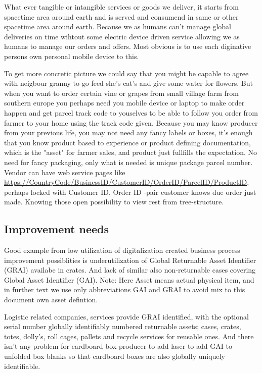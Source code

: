 What ever tangible or intangible services or goods we deliver, it starts from
spacetime area around earth and is served and consumend in same or other
spacetime area around earth. Because we as humans can't manage global deliveries
on time wihtout some electric device driven service allowing we as humans to
manage our orders and offers. Most obvious is to use each diginative persons
own personal mobile device to this.

To get more concretic picture we could say that you might be capable to agree
with neigbour granny to go feed she's cat's and give some water for flowers.
But when you want to order certain vine or grapes from small village farm from
southern europe you perhaps need you mobile device or laptop to make order
happen and get parcel track code to youselves to be able to follow you order
from farmer to your home using the track code given. Because you may know
producer from your previous life, you may not need any fancy labels or boxes,
it's enough that you know product based to experience or product defining
documentation, which is the "asset" for farmer sales, and product just
fullfills the expectation. No need for fancy packaging, only what is needed is
unique package parcel number. Vendor can have web service pages like
\url{https://CountryCode/BusinessID/CustomerID/OrderID/ParcelID/ProductID},
perhaps locked with Customer ID, Order ID -pair customer knows due order
just made. Knowing those open possibility to view rest from tree-structure.

\subsection{Improvement needs}
\label{improvement_needs}

Good example from low utilization of digitalization created business process
improvement possiblities is underutilization of Global Returnable Asset
Identifier (GRAI)\cite{GRAI}\cite{IFCO}\cite{EUROPOOL} availabe in crates.
And lack of similar also non-returnable cases covering Global Asset Identifier
(GAI)\cite{CajoMakeBright}. Note: Here Asset means actual physical item,
and in further text we use only abbreviations GAI and GRAI to avoid mix to
this document own asset defintion.

Logistic related companies, services provide GRAI\cite{GRAI} identified, with
the optional serial number globally identifiably numbered returnable assets;
cases, crates, totes, dolly's, roll cages, pallets and recycle services for
reusable ones. And there isn't any problem for cardboard box producer to add
laser to add GAI\cite{CajoMakeBright} to unfolded box blanks so that cardboard
boxes are also globally uniquely identifiable.

